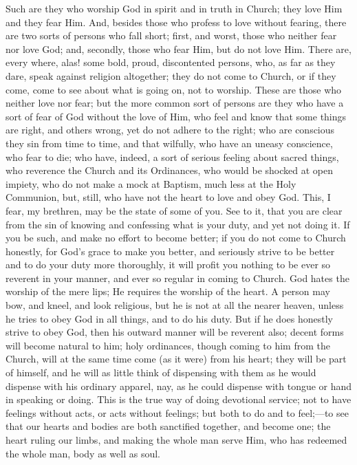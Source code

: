 Such are they who worship God in spirit and in truth in Church;
they love Him and they fear Him. And, besides those who profess to
love without fearing, there are two sorts of persons who fall short;
first, and worst, those who neither fear nor love God; and, secondly,
those who fear Him, but do not love Him. There are, every where, alas!
some bold, proud, discontented persons, who, as far as they dare,
speak against religion altogether; they do not come to Church, or if
they come, come to see about what is going on, not to worship. These
are those who neither love nor fear; but the more common sort of
persons are they who have a sort of fear of God without the love of
Him, who feel and know that some things are right, and others wrong,
yet do not adhere to the right; who are conscious they sin from time
to time, and that wilfully, who have an uneasy conscience, who fear to
die; who have, indeed, a sort of serious feeling about sacred things,
who reverence the Church and its Ordinances, who would be shocked at
open impiety, who do not make a mock at Baptism, much less at the Holy
Communion, but, still, who have not the heart to love and obey God.
This, I fear, my brethren, may be the state of some of you. See to it,
that you are clear from the sin of knowing and confessing what is your
duty, and yet not doing it. If you be such, and make no effort to
become better; if you do not come to Church honestly, for God's grace
to make you better, and seriously strive to be better and to do your
duty more thoroughly, it will profit you nothing to be ever so
reverent in your manner, and ever so regular in coming to Church. God
hates the worship of the mere lips; He requires the worship of the
heart. A person may bow, and kneel, and look religious, but he is not
at all the nearer heaven, unless he tries to obey God in all things,
and to do his duty. But if he does honestly strive to obey God, then
his outward manner will be reverent also; decent forms will become
natural to him; holy ordinances, though coming to him from the Church,
will at the same time come (as it were) from his heart; they will be
part of himself, and he will as little think of dispensing with them
as he would dispense with his ordinary apparel, nay, as he could
dispense with tongue or hand in speaking or doing. This is the true
way of doing devotional service; not to have feelings without acts, or
acts without feelings; but both to do and to feel;—to see that our
hearts and bodies are both sanctified together, and become one; the
heart ruling our limbs, and making the whole man serve Him, who has
redeemed the whole man, body as well as soul.

